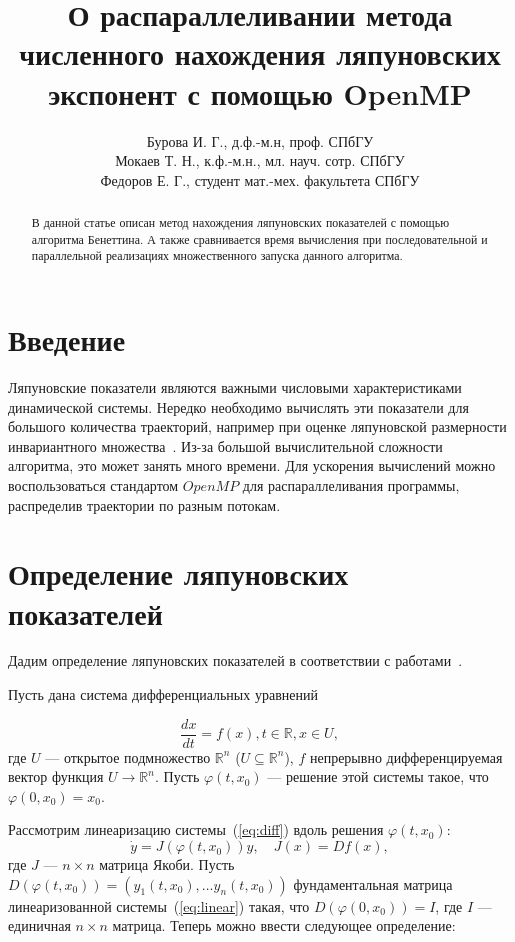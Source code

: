 \documentclass{spisok-article}
\title{О распараллеливании метода численного нахождения ляпуновских экспонент с помощью OpenMP}
\author{Бурова И. Г., д.ф.-м.н, проф. СПбГУ 

Мокаев Т. Н., к.ф.-м.н., мл. науч. сотр. СПбГУ

Федоров Е. Г., студент мат.-мех. факультета СПбГУ}
\begin{document}
\maketitle

\begin{abstract}
В данной статье описан метод нахождения ляпуновских показателей с помощью алгоритма Бенеттина. А также сравнивается время вычисления при последовательной и параллельной реализациях множественного запуска данного алгоритма.
\end{abstract}

\section{Введение}
Ляпуновские показатели являются важными числовыми характеристиками динамической системы. Нередко необходимо вычислять эти показатели для большого количества траекторий, например при оценке ляпуновской размерности инвариантного множества~\cite{book:strange_attractors, art:kuznetsov_lyapunov_dim}. Из-за большой вычислительной сложности алгоритма, это может занять много времени. Для ускорения вычислений можно воспользоваться стандартом $OpenMP$ для распараллеливания программы, распределив траектории по разным потокам.

\section{Определение ляпуновских показателей}

Дадим определение ляпуновских показателей в соответствии с работами~\cite{art:lyapunov_exp, art:CNSNS_2014}.

Пусть дана система дифференциальных уравнений

\begin{equation} \label{eq:diff}
\frac{dx}{dt} = f(x), t \in \mathbb{R}, x \in U,
\end{equation}
где $U$ --- открытое подмножество $\mathbb{R} ^n$ ($U \subseteq \mathbb{R} ^n$), $f$ непрерывно дифференцируемая вектор функция $U \to \mathbb{R} ^n$. Пусть $\varphi (t, x_0)$ --- решение этой системы такое, что $\varphi (0,x_0) = x_0$.

Рассмотрим линеаризацию системы~(\ref{eq:diff}) вдоль решения $\varphi (t,x_0)$:
\begin{equation} \label{eq:linear}
\dot{y} = J(\varphi (t,x_0)) y, \quad J(x) = D f(x),
\end{equation}
где $J$ --- $n \times n$ матрица Якоби. Пусть $D(\varphi (t,x_0)) = \left (y_1 (t,x_0), \ldots y_n(t,x_0) \right )$ фундаментальная матрица линеаризованной системы~(\ref{eq:linear}) такая, что $D(\varphi (0,x_0)) = I$, где $I$ --- единичная $n \times n$ матрица. Теперь можно ввести следующее определение:
\end{document}
